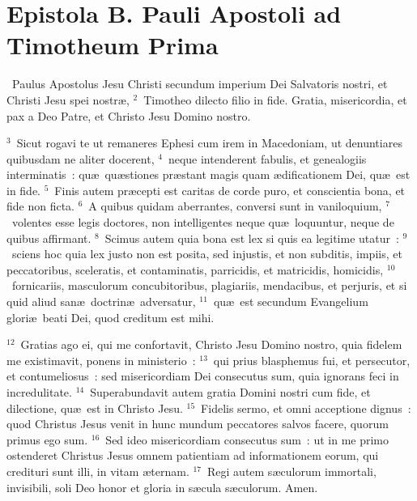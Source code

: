 {\centering \section*{Epistola B. Pauli Apostoli ad Timotheum Prima}}\thispagestyle{empty}

~Paulus Apostolus Jesu Christi secundum imperium Dei Salvatoris nostri, et Christi Jesu spei nostr\ae ,
${}^{2}$~Timotheo dilecto filio in fide. Gratia, misericordia, et pax a Deo Patre, et Christo Jesu Domino nostro.


${}^{3}$~Sicut rogavi te ut remaneres Ephesi cum irem in Macedoniam, ut denuntiares quibusdam ne aliter docerent,
${}^{4}$~neque intenderent fabulis, et genealogiis interminatis~: qu\ae\ qu\ae stiones pr\ae stant magis quam \ae dificationem Dei, qu\ae\ est in fide.
${}^{5}$~Finis autem pr\ae cepti est caritas de corde puro, et conscientia bona, et fide non ficta.
${}^{6}$~A quibus quidam aberrantes, conversi sunt in vaniloquium,
${}^{7}$~volentes esse legis doctores, non intelligentes neque qu\ae\ loquuntur, neque de quibus affirmant.
${}^{8}$~Scimus autem quia bona est lex si quis ea legitime utatur~:
${}^{9}$~sciens hoc quia lex justo non est posita, sed injustis, et non subditis, impiis, et peccatoribus, sceleratis, et contaminatis, parricidis, et matricidis, homicidis,
${}^{10}$~fornicariis, masculorum concubitoribus, plagiariis, mendacibus, et perjuris, et si quid aliud san\ae\ doctrin\ae\ adversatur,
${}^{11}$~qu\ae\ est secundum Evangelium glori\ae\ beati Dei, quod creditum est mihi.


${}^{12}$~Gratias ago ei, qui me confortavit, Christo Jesu Domino nostro, quia fidelem me existimavit, ponens in ministerio~:
${}^{13}$~qui prius blasphemus fui, et persecutor, et contumeliosus~: sed misericordiam Dei consecutus sum, quia ignorans feci in incredulitate.
${}^{14}$~Superabundavit autem gratia Domini nostri cum fide, et dilectione, qu\ae\ est in Christo Jesu.
${}^{15}$~Fidelis sermo, et omni acceptione dignus~: quod Christus Jesus venit in hunc mundum peccatores salvos facere, quorum primus ego sum.
${}^{16}$~Sed ideo misericordiam consecutus sum~: ut in me primo ostenderet Christus Jesus omnem patientiam ad informationem eorum, qui credituri sunt illi, in vitam \ae ternam.
${}^{17}$~Regi autem s\ae culorum immortali, invisibili, soli Deo honor et gloria in s\ae cula s\ae culorum. Amen.


